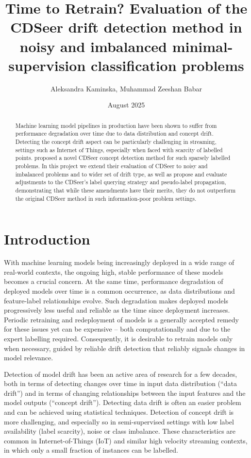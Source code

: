 \documentclass{svproc}
\title{Time to Retrain? Evaluation of the CDSeer drift detection method in noisy and imbalanced minimal-supervision classification problems}
\author{Aleksandra Kaminska, Muhammad Zeeshan Babar}
\institute{University of Leeds, School of Computing, ODL MSc in AI, UK.}
\date{August 2025}
\begin{document}
\maketitle

\begin{abstract}
    Machine learning model pipelines in production have been shown to suffer from performance degradation over time due to data distribution and concept drift. Detecting the concept drift aspect can be particularly challenging in streaming, settings such as Internet of Things, especially when faced with scarcity of labelled points. \cite{pham2025} proposed a novel CDSeer concept detection method for such sparsely labelled problems. In this project we extend their evaluation of CDSeer to noisy and imbalanced problems and to wider set of drift type, as well as propose and evaluate adjustments to the CDSeer’s label querying strategy and pseudo-label propagation, demonstrating that while these amendments have their merits, they do not outperform the original CDSeer method in such information-poor problem settings.  
    
\end{abstract}

\section{Introduction}
    With machine learning models being increasingly deployed in a wide range of real-world contexts, the ongoing high, stable performance of these models becomes a crucial concern. At the same time, performance degradation of deployed models over time is a common occurrence, as data distributions and feature-label relationships evolve. Such degradation makes deployed models progressively less useful and reliable as the time since deployment increases. Periodic retraining and redeployment of models is a generally accepted remedy for these issues yet can be expensive – both computationally and due to the expert labelling required. Consequently, it is desirable to retrain models only when necessary, guided by reliable drift detection that reliably signals changes in model relevance.
    
    Detection of model drift has been an active area of research for a few decades, both in terms of detecting changes over time in input data distribution (“data drift”) and in terms of changing relationships between the input features and the model outputs (“concept drift”). Detecting data drift is often an easier problem and can be achieved using statistical techniques. Detection of concept drift is more challenging, and especially so in semi-supervised settings with low label availability (label scarcity), noise or class imbalance. These characteristics are common in Internet-of-Things (IoT) and similar high velocity streaming contexts, in which only a small fraction of instances can be labelled.
    
\end{document}
